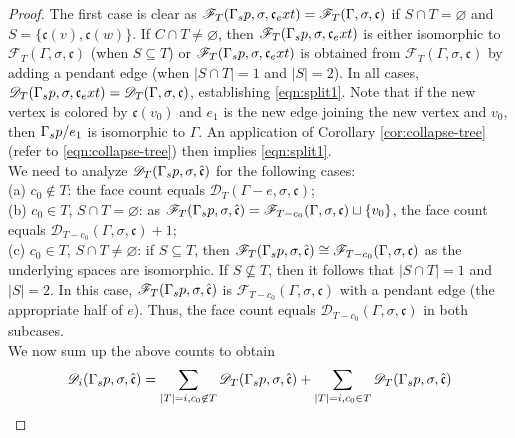 \documentclass[10pt, reqno]{amsart}
\newcommand{\hf}{\hspace*{0.5cm}}
\theoremstyle{plain}
\theoremstyle{remark}
\theoremstyle{definition}
\numberwithin{equation}{section}
\begin{document}
\begin{proof}
The first case is clear as $\mathscr{F}_T(\Gamma_\textup{sp},\sigma,\mathfrak{c}_\textup{ext})=\mathscr{F}_T(\Gamma,\sigma,\mathfrak{c})$ if $S\cap T=\varnothing$ and $S=\{\mathfrak{c}(v),\mathfrak{c}(w)\}$. If $C\cap T\neq \varnothing$, then $\mathscr{F}_T(\Gamma_\textup{sp},\sigma,\mathfrak{c}_\textup{ext})$ is either isomorphic to $\mathscr{F}_T(\Gamma,\sigma,\mathfrak{c})$ (when $S\subseteq T$) or $\mathscr{F}_T(\Gamma_\textup{sp},\sigma,\mathfrak{c}_\textup{ext})$ is obtained from $\mathscr{F}_T(\Gamma,\sigma,\mathfrak{c})$ by adding a pendant edge (when $|S\cap T|=1$ and $|S|=2$). In all cases, $\mathscr{D}_T(\Gamma_\textup{sp},\sigma,\mathfrak{c}_\textup{ext})=\mathscr{D}_T(\Gamma,\sigma,\mathfrak{c})$, establishing \eqref{eqn:split1}. Note that if the new vertex is colored by $\mathfrak{c}(v_0)$ and $e_1$ is the new edge joining the new vertex and $v_0$, then $\Gamma_\textup{sp}/e_1$ is isomorphic to $\Gamma$. An application of Corollary \ref{cor:collapse-tree} (refer to \eqref{eqn:collapse-tree}) then implies \eqref{eqn:split1}.\\
\hf We need to analyze $\mathscr{D}_T(\Gamma_\textup{sp},\sigma,\hat{\mathfrak{c}})$ for the following cases:\\
\hf (a) $c_0\not\in T$: the face count equals $\mathscr{D}_T(\Gamma-e,\sigma,\mathfrak{c})$;\\
\hf (b) $c_0\in T$, $S\cap T=\varnothing$: as $\mathscr{F}_T(\Gamma_\textup{sp},\sigma,\hat{\mathfrak{c}})=\mathscr{F}_{T-c_0}(\Gamma,\sigma,\mathfrak{c})\sqcup \{v_0\}$, the face count equals $\mathscr{D}_{T-c_0}(\Gamma,\sigma,\mathfrak{c})+1$;\\
\hf (c) $c_0\in T$, $S\cap T\neq \varnothing$: if $S\subseteq T$, then $\mathscr{F}_T(\Gamma_\textup{sp},\sigma,\hat{\mathfrak{c}})\cong \mathscr{F}_{T-c_0}(\Gamma,\sigma,\mathfrak{c})$ as the underlying spaces are isomorphic. If $S\not\subseteq T$, then it follows that $|S\cap T|=1$ and $|S|=2$. In this case, $\mathscr{F}_T(\Gamma_\textup{sp},\sigma,\hat{\mathfrak{c}})$ is $\mathscr{F}_{T-c_0}(\Gamma,\sigma,\mathfrak{c})$ with a pendant edge (the appropriate half of $e$). Thus, the face count equals $\mathscr{D}_{T-c_0}(\Gamma,\sigma,\mathfrak{c})$ in both subcases.\\
\hf We now sum up the above counts to obtain
\begin{align*}
\mathscr{D}_i(\Gamma_\textup{sp},\sigma,\hat{\mathfrak{c}}) & = \sum_{|T|=i, c_0\not\in T} \mathscr{D}_T(\Gamma_\textup{sp},\sigma,\hat{\mathfrak{c}})+\sum_{|T|=i,c_0\in T} \mathscr{D}_T(\Gamma_\textup{sp},\sigma,\hat{\mathfrak{c}})\\

\end{align*}
\end{proof}
\end{document}
